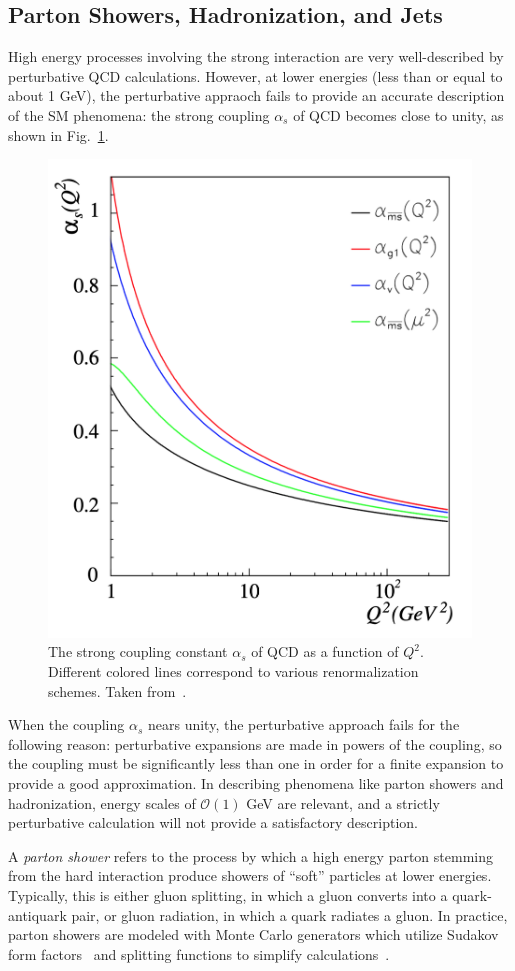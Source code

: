 \subsection{Parton Showers, Hadronization, and Jets} \label{sec:pp_physics_jets}
High energy processes involving the strong interaction are very well-described by perturbative QCD calculations.
However, at lower energies (less than or equal to about 1 GeV), the perturbative appraoch fails to provide an accurate description of the SM phenomena: the strong coupling $\alpha_s$ of QCD becomes close to unity, as shown in Fig.~\ref{fig:pp_qcd_coupling}.
\begin{figure} [htbp!]
    \centering
    \includegraphics[width=0.6\linewidth]{figures/physics_of_pp/pp_qcd_coupling.png}
    \caption{The strong coupling constant $\alpha_s$ of QCD as a function of $Q^2$. Different colored lines correspond to various renormalization schemes. Taken from~\cite{Deur:2016tte}.}
    \label{fig:pp_qcd_coupling}
\end{figure}
When the coupling $\alpha_s$ nears unity, the perturbative approach fails for the following reason: perturbative expansions are made in powers of the coupling, so the coupling must be significantly less than one in order for a finite expansion to provide a good approximation.
In describing phenomena like parton showers and hadronization, energy scales of $\mathcal O(1)$ GeV are relevant, and a strictly perturbative calculation will not provide a satisfactory description.

A \emph{parton shower} refers to the process by which a high energy parton stemming from the hard interaction produce showers of ``soft'' particles at lower energies.
Typically, this is either gluon splitting, in which a gluon converts into a quark-antiquark pair, or gluon radiation, in which a quark radiates a gluon.
In practice, parton showers are modeled with Monte Carlo generators which utilize Sudakov form factors~\cite{Sudakov:1954sw} and splitting functions to simplify calculations~\cite{Hoche:2014rga}.

